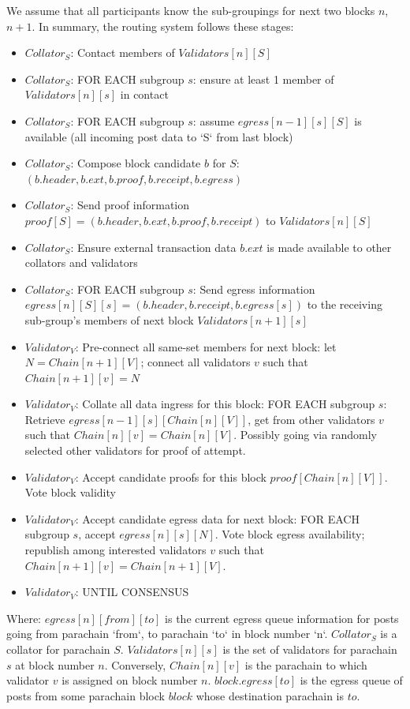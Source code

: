 \documentclass[9pt,oneside]{amsart}
\providecommand{\tightlist}{%
  \setlength{\itemsep}{0pt}\setlength{\parskip}{0pt}}
\begin{document}
\begin{multicols}{2}
 We assume that all participants know the sub-groupings for next two blocks $n$, $n+1$. In summary, the routing system follows these stages:

\begin{itemize}
\tightlist
\item $Collator_S$: Contact members of $Validators[n][S]$
\item $Collator_S$: FOR EACH subgroup $s$: ensure at least 1 member of $Validators[n][s]$ in contact
\item $Collator_S$: FOR EACH subgroup $s$: assume $egress[n-1][s][S]$ is available (all incoming post data to `S` from last block)
\item $Collator_S$: Compose block candidate $b$ for $S$: $(b.header, b.ext, b.proof, b.receipt, b.egress)$
\item $Collator_S$: Send proof information $proof[S] = (b.header, b.ext, b.proof, b.receipt)$ to $Validators[n][S]$
\item $Collator_S$: Ensure external transaction data $b.ext$ is made available to other collators and validators
\item $Collator_S$: FOR EACH subgroup $s$: Send egress information $egress[n][S][s] = (b.header, b.receipt, b.egress[s])$ to the receiving sub-group's members of next block $Validators[n+1][s]$
\item $Validator_V$: Pre-connect all same-set members for next block: let $N = Chain[n+1][V]$; connect all validators $v$ such that $Chain[n+1][v] = N$
\item $Validator_V$: Collate all data ingress for this block: FOR EACH subgroup $s$: Retrieve $egress[n-1][s][Chain[n][V]]$, get from other validators $v$ such that $Chain[n][v] = Chain[n][V]$. Possibly going via randomly selected other validators for proof of attempt.
\item $Validator_V$: Accept candidate proofs for this block $proof[Chain[n][V]]$. Vote block validity
\item $Validator_V$: Accept candidate egress data for next block: FOR EACH subgroup $s$, accept $egress[n][s][N]$. Vote block egress availability; republish among interested validators $v$ such that $Chain[n+1][v] = Chain[n+1][V]$.
\item $Validator_V$: UNTIL CONSENSUS
\end{itemize}

 Where: $egress[n][from][to]$ is the current egress queue information for posts going from parachain `from`, to parachain `to` in block number `n`. $Collator_S$ is a collator for parachain $S$. $Validators[n][s]$ is the set of validators for parachain $s$ at block number $n$. Conversely, $Chain[n][v]$ is the parachain to which validator $v$ is assigned on block number $n$. $block.egress[to]$ is the egress queue of posts from some parachain block $block$ whose destination parachain is $to$.


\end{multicols}
\end{document}
